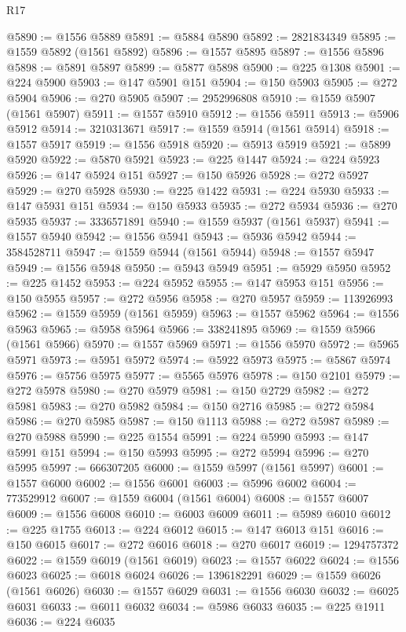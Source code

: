\begin{lexlean}{R17}
\begin{coremodule}
@5890 := @1556 @5889
@5891 := @5884 @5890
@5892 := 2821834349
@5895 := @1559 @5892 (@1561 @5892)
@5896 := @1557 @5895
@5897 := @1556 @5896
@5898 := @5891 @5897
@5899 := @5877 @5898
@5900 := @225 @1308
@5901 := @224 @5900
@5903 := @147 @5901 @151
@5904 := @150 @5903
@5905 := @272 @5904
@5906 := @270 @5905
@5907 := 2952996808
@5910 := @1559 @5907 (@1561 @5907)
@5911 := @1557 @5910
@5912 := @1556 @5911
@5913 := @5906 @5912
@5914 := 3210313671
@5917 := @1559 @5914 (@1561 @5914)
@5918 := @1557 @5917
@5919 := @1556 @5918
@5920 := @5913 @5919
@5921 := @5899 @5920
@5922 := @5870 @5921
@5923 := @225 @1447
@5924 := @224 @5923
@5926 := @147 @5924 @151
@5927 := @150 @5926
@5928 := @272 @5927
@5929 := @270 @5928
@5930 := @225 @1422
@5931 := @224 @5930
@5933 := @147 @5931 @151
@5934 := @150 @5933
@5935 := @272 @5934
@5936 := @270 @5935
@5937 := 3336571891
@5940 := @1559 @5937 (@1561 @5937)
@5941 := @1557 @5940
@5942 := @1556 @5941
@5943 := @5936 @5942
@5944 := 3584528711
@5947 := @1559 @5944 (@1561 @5944)
@5948 := @1557 @5947
@5949 := @1556 @5948
@5950 := @5943 @5949
@5951 := @5929 @5950
@5952 := @225 @1452
@5953 := @224 @5952
@5955 := @147 @5953 @151
@5956 := @150 @5955
@5957 := @272 @5956
@5958 := @270 @5957
@5959 := 113926993
@5962 := @1559 @5959 (@1561 @5959)
@5963 := @1557 @5962
@5964 := @1556 @5963
@5965 := @5958 @5964
@5966 := 338241895
@5969 := @1559 @5966 (@1561 @5966)
@5970 := @1557 @5969
@5971 := @1556 @5970
@5972 := @5965 @5971
@5973 := @5951 @5972
@5974 := @5922 @5973
@5975 := @5867 @5974
@5976 := @5756 @5975
@5977 := @5565 @5976
@5978 := @150 @2101
@5979 := @272 @5978
@5980 := @270 @5979
@5981 := @150 @2729
@5982 := @272 @5981
@5983 := @270 @5982
@5984 := @150 @2716
@5985 := @272 @5984
@5986 := @270 @5985
@5987 := @150 @1113
@5988 := @272 @5987
@5989 := @270 @5988
@5990 := @225 @1554
@5991 := @224 @5990
@5993 := @147 @5991 @151
@5994 := @150 @5993
@5995 := @272 @5994
@5996 := @270 @5995
@5997 := 666307205
@6000 := @1559 @5997 (@1561 @5997)
@6001 := @1557 @6000
@6002 := @1556 @6001
@6003 := @5996 @6002
@6004 := 773529912
@6007 := @1559 @6004 (@1561 @6004)
@6008 := @1557 @6007
@6009 := @1556 @6008
@6010 := @6003 @6009
@6011 := @5989 @6010
@6012 := @225 @1755
@6013 := @224 @6012
@6015 := @147 @6013 @151
@6016 := @150 @6015
@6017 := @272 @6016
@6018 := @270 @6017
@6019 := 1294757372
@6022 := @1559 @6019 (@1561 @6019)
@6023 := @1557 @6022
@6024 := @1556 @6023
@6025 := @6018 @6024
@6026 := 1396182291
@6029 := @1559 @6026 (@1561 @6026)
@6030 := @1557 @6029
@6031 := @1556 @6030
@6032 := @6025 @6031
@6033 := @6011 @6032
@6034 := @5986 @6033
@6035 := @225 @1911
@6036 := @224 @6035

\end{coremodule}
\end{lexlean}
